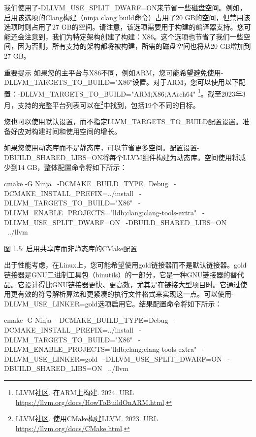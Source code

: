 我们使用了-DLLVM\_USE\_SPLIT\_DWARF=ON来节省一些磁盘空间。例如，启用该选项的Clang构建（ninja clang build命令）占用了20 GB的空间，但禁用该选项时则占用了27 GB的空间。请注意，该选项需要用于构建的编译器支持。您可能还会注意到，我们为特定架构创建了构建：X86。这个选项也节省了我们一些空间，因为否则，所有支持的架构都将被构建，所需的磁盘空间也将从20 GB增加到27 GB。

\begin{myNotic}{重要提示}
如果您的主平台与X86不同，例如ARM，您可能希望避免使用-DLLVM\_TARGETS\_TO\_BUILD="X86"设置。对于ARM，您可以使用以下配置：-DLLVM\_TARGETS\_TO\_BUILD="ARM;X86;AArch64" \footnote{LLVM社区. 在ARM上构建. 2024. URL \url{https://llvm.org/docs/HowToBuildOnARM.html}.}。截至2023年3月，支持的完整平台列表可以在\footnote{LLVM社区. 使用CMake构建LLVM. 2023. URL \url{https://llvm.org/docs/CMake.html}.}中找到，包括19个不同的目标。
\end{myNotic}


您也可以使用默认设置，而不指定LLVM\_TARGETS\_TO\_BUILD配置设置。准备好应对构建时间和使用空间的增长。

如果您使用动态库而不是静态库，可以节省更多空间。配置设置-DBUILD\_SHARED\_LIBS=ON将每个LLVM组件构建为动态库。空间使用将减少到14 GB，整体配置命令将如下所示：


\begin{shell}
cmake -G Ninja \
  -DCMAKE_BUILD_TYPE=Debug \
  -DCMAKE_INSTALL_PREFIX=../install \
  -DLLVM_TARGETS_TO_BUILD="X86" \
  -DLLVM_ENABLE_PROJECTS="lldb;clang;clang-tools-extra" \
  -DLLVM_USE_SPLIT_DWARF=ON \
  -DBUILD_SHARED_LIBS=ON \
  ../llvm
\end{shell}

\begin{center}
图 1.5: 启用共享库而非静态库的CMake配置
\end{center}

出于性能考虑，在Linux上，您可能希望使用gold链接器而不是默认链接器。gold链接器是GNU二进制工具包（binutils）的一部分，它是一种GNU链接器的替代品。它设计得比GNU链接器更快、更高效，尤其是在链接大型项目时。它通过使用更有效的符号解析算法和更紧凑的执行文件格式来实现这一点。可以使用-DLLVM\_USE\_LINKER=gold选项启用它。结果配置命令将如下所示：

\begin{shell}
cmake -G Ninja \
  -DCMAKE_BUILD_TYPE=Debug \
  -DCMAKE_INSTALL_PREFIX=../install \
  -DLLVM_TARGETS_TO_BUILD="X86" \
  -DLLVM_ENABLE_PROJECTS="lldb;clang;clang-tools-extra" \
  -DLLVM_USE_LINKER=gold \
  -DLLVM_USE_SPLIT_DWARF=ON \
  -DBUILD_SHARED_LIBS=ON \
  ../llvm
\end{shell}

